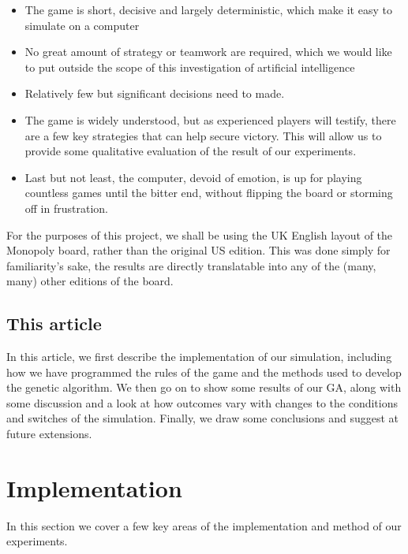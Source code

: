 \documentclass[11pt,a4paper,twocolumn]{scrartcl}
\begin{document}
\begin{itemize}

\item The game is short, decisive and largely deterministic, which make it easy to simulate on a computer 
\item No great amount of strategy or teamwork are required, which we would like to put outside the scope of this investigation of artificial intelligence 
\item Relatively few but significant decisions need to made. 
\item The game is widely understood, but as experienced players will testify, there are a few key strategies that can help secure victory. This will allow us to provide some qualitative evaluation of the result of our experiments.
\item Last but not least, the computer, devoid of emotion, is up for playing countless games until the bitter end, without flipping the board or storming off in frustration.

\end{itemize}

For the purposes of this project, we shall be using the UK English layout of the Monopoly board, rather than the original US edition. This was done simply for familiarity's sake, the results are directly translatable into any of the (many, many) other editions of the board.

\subsection{This article}

In this article, we first describe the implementation of our simulation, including how we have programmed the rules of the game and the methods used to develop the genetic algorithm. We then go on to show some results of our GA, along with some discussion and a look at how outcomes vary with changes to the conditions and switches of the simulation. Finally, we draw some conclusions and suggest at future extensions.

\section{Implementation}
\label{sec:imp}

In this section we cover a few key areas of the implementation and method of our experiments.
\end{document}

